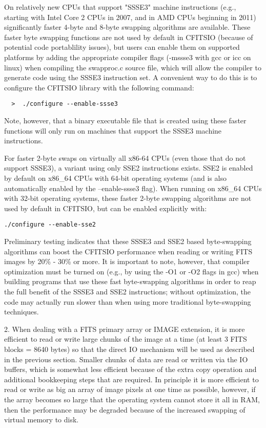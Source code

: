 \documentclass[11pt]{book}
\begin{document}
On relatively new CPUs that support "SSSE3" machine instructions
(e.g., starting with Intel Core 2 CPUs in 2007, and in AMD CPUs
beginning in 2011) significantly faster 4-byte and 8-byte swapping
algorithms are available. These faster byte swapping functions are
not used by default in CFITSIO (because of potential code
portablility issues), but users can enable them on supported
platforms by adding the appropriate compiler flags (-mssse3 with gcc
or icc on linux) when compiling the swapproc.c source file, which will
allow the compiler to generate code using the SSSE3 instruction set.
A convenient way to do this is to configure the CFITSIO library
with the following command:

\begin{verbatim}
  >  ./configure --enable-ssse3
\end{verbatim}
Note, however, that a binary executable file that is
created using these faster functions will only run on
machines that support the SSSE3 machine instructions.

For faster 2-byte swaps on virtually all x86-64 CPUs (even those that
do not support SSSE3), a variant using only SSE2 instructions exists.
SSE2 is enabled by default on x86\_64 CPUs with 64-bit operating systems
(and is also automatically enabled by the --enable-ssse3 flag).
When running on x86\_64 CPUs with 32-bit operating systems, these faster
2-byte swapping algorithms are not used by default in CFITSIO, but can be
enabled explicitly with:

\begin{verbatim}
./configure --enable-sse2
\end{verbatim}
Preliminary testing indicates that these SSSE3 and SSE2 based
byte-swapping algorithms can boost the CFITSIO performance when
reading or writing FITS images by 20\% - 30\% or more.
It is important to note, however, that compiler optimization must be
turned on (e.g., by using the -O1 or -O2 flags in gcc) when building
programs that use these fast byte-swapping algorithms in order
to reap the full benefit of the SSSE3 and SSE2 instructions; without
optimization, the code may actually run slower than when using
more traditional byte-swapping techniques.

2.  When dealing with a FITS primary array or IMAGE extension, it is
more efficient to read or write large chunks of the  image at a time
(at least 3 FITS blocks = 8640 bytes) so that the direct IO mechanism
will be used as described in the previous section.  Smaller chunks of
data are read or written via the IO buffers, which is somewhat less
efficient because of the extra copy operation and additional
bookkeeping steps that are required.  In principle it is more efficient
to read or write as big an array of image pixels at one time as
possible, however, if the array becomes so large that the operating
system cannot store it all in RAM, then the performance may be degraded
because of the increased swapping of virtual memory to disk.
\end{document}
